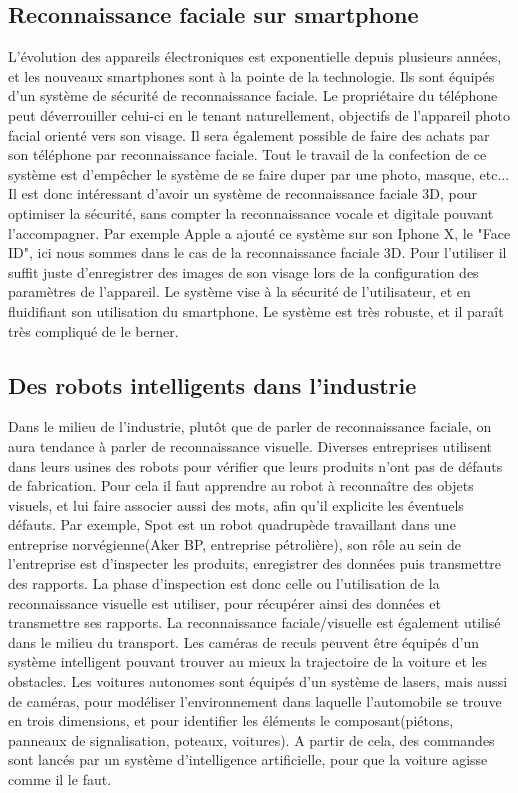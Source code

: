 \documentclass[12pt,french]{article}
\theoremstyle{plain}
\theoremstyle{definition}
\begin{document}
\subsection{Reconnaissance faciale sur smartphone}
L'évolution des appareils électroniques est exponentielle depuis plusieurs années, et les nouveaux smartphones sont à la pointe de la technologie. Ils sont équipés d'un système de sécurité de reconnaissance faciale. Le propriétaire du téléphone peut déverrouiller celui-ci en le tenant naturellement, objectifs de l'appareil photo facial orienté vers son visage. Il sera également possible de faire des achats par son téléphone par reconnaissance faciale. Tout le travail de la confection de ce système est d'empêcher le système de se faire duper par une photo, masque, etc... Il est donc intéressant d'avoir un système de reconnaissance faciale 3D, pour optimiser la sécurité, sans compter la reconnaissance vocale et digitale pouvant l'accompagner.
Par exemple Apple a ajouté ce système sur son Iphone X, le "Face ID", ici nous sommes dans le cas de la reconnaissance faciale 3D. Pour l'utiliser il suffit juste d'enregistrer des images de son visage lors de la configuration des paramètres de l'appareil. Le système vise à la sécurité de l'utilisateur, et en fluidifiant son utilisation du smartphone. Le système est très robuste, et il paraît très compliqué de le berner.
\subsection{Des robots intelligents dans l'industrie}
Dans le milieu de l'industrie, plutôt que de parler de reconnaissance faciale, on aura tendance à parler de reconnaissance visuelle. Diverses entreprises utilisent dans leurs usines des robots pour vérifier que leurs produits n'ont pas de défauts de fabrication. Pour cela il faut apprendre au robot à reconnaître des objets visuels, et lui faire associer aussi des mots, afin qu'il explicite les éventuels défauts. Par exemple, Spot est un robot quadrupède travaillant dans une entreprise norvégienne(Aker BP, entreprise pétrolière), son rôle au sein de l'entreprise est d'inspecter les produits, enregistrer des données puis transmettre des rapports. La phase d'inspection est donc celle ou l'utilisation de la reconnaissance visuelle est utiliser, pour récupérer ainsi des données et transmettre ses rapports.
La reconnaissance faciale/visuelle est également utilisé dans le milieu du transport. Les caméras de reculs peuvent être équipés d'un système intelligent pouvant trouver au mieux la trajectoire de la voiture et les obstacles.
Les voitures autonomes sont équipés d'un système de lasers, mais aussi de caméras, pour modéliser l'environnement dans laquelle l'automobile se trouve en trois dimensions, et pour identifier les éléments le composant(piétons, panneaux de signalisation, poteaux, voitures). A partir de cela, des commandes sont lancés par un système d'intelligence artificielle, pour que la voiture agisse comme il le faut.
\end{document}
